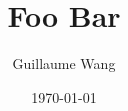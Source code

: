 \documentclass{article}
\title{Foo Bar}
\date{\today}
\author{Guillaume Wang}
\numberwithin{definition}{section}
\numberwithin{theorem}{section}
\numberwithin{corollary}{section}
\numberwithin{proposition}{section}
\numberwithin{lemma}{section}
\numberwithin{claim}{section}
\numberwithin{fact}{section}
\numberwithin{remark}{section}
\numberwithin{example}{section}
\numberwithin{equation}{section}
\newif\ifextended  %
\begin{document}
\maketitle









\printbibliography
{} %

\ifextended%
    \newpage
    \appendix
    \phantomsection
    \addcontentsline{toc}{section}{APPENDIX}

    \section{Proofs}
    
    
    
\fi
\end{document}
